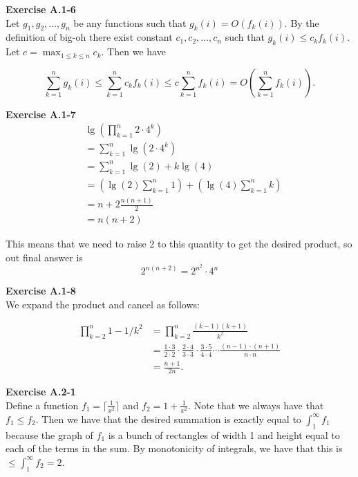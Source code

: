 \documentclass{article}
\begin{document}
\noindent\textbf{Exercise A.1-6}\\

Let $g_1, g_2, \ldots, g_n$ be any functions such that $g_k(i) = O(f_k(i))$. By the definition of big-oh there exist constant $c_1, c_2, \ldots, c_n$ such that $g_k(i) \leq c_kf_k(i)$.  Let $c = \max_{1 \leq k \leq n} c_k$.  Then we have

 \[\sum_{k=1}^n g_k(i) \leq \sum_{k=1}^nc_kf_k(i) \leq c\sum_{k=1}^n f_k(i) = O\left(\sum_{k=1}^nf_k(i)\right).\]

\noindent\textbf{Exercise A.1-7}\\

\begin{align*}
&\lg\left(\prod_{k=1}^n 2\cdot 4^k\right)\\
&=\sum_{k=1}^n \lg(2 \cdot 4^k) \\
&=\sum_{k=1}^n \lg(2) + k \lg(4) \\
&=\left(\lg(2) \sum_{k=1}^n 1\right) + \left(\lg(4) \sum_{k=1}^n k\right) \\
&=n + 2 \frac{n(n+1)}{2}\\
&= n(n+2)
\end{align*}

This means that we need to raise 2 to this quantity to get the desired product, so out final answer is
\[
2^{n(n+2)} = 2^{n^2} \cdot 4^n
\]


\noindent\textbf{Exercise A.1-8}\\

We expand the product and cancel as follows:

\begin{align*}
\prod_{k=2}^n 1 - 1/k^2  &=  \prod_{k=2}^n \frac{(k-1)(k+1)}{k^2} \\
&= \frac{1 \cdot 3}{2 \cdot 2} \cdot \frac{2 \cdot 4}{3 \cdot 3} \cdot \frac{3 \cdot 5}{4 \cdot 4} \cdots \frac{(n-1)\cdot(n+1)}{n \cdot n} \\
&= \frac{n+1}{2n}.
\end{align*}

\noindent\textbf{Exercise A.2-1}\\
Define a function $f_1 = \lceil \frac{1}{x^2} \rceil$ and $f_2 = 1+ \frac{1}{x^2}$. Note that we always have that $f_1 \le f_2$. Then we have that the desired summation is exactly equal to $\int_1^\infty f_1$ because the graph of $f_1$ is a bunch of rectangles of width 1 and height equal to each of the terms in the sum. By monotonicity of integrals, we have that this is $ \le \int_1^\infty f_2 =2$. \\
\end{document}
